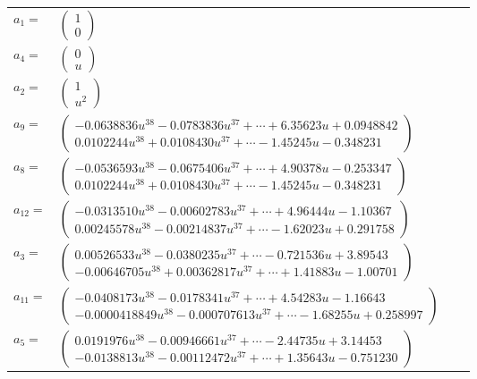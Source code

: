 \documentclass[1p]{elsarticle_modified}
\theoremstyle{definition}
\begin{document}
\begin{tabular}{m{7pt} m{180pt} m{7pt} m{180pt} }
\flushright $a_{1}=$&$\begin{pmatrix}1\\0\end{pmatrix}$ \\
\flushright $a_{4}=$&$\begin{pmatrix}0\\u\end{pmatrix}$ \\
\flushright $a_{2}=$&$\begin{pmatrix}1\\u^2\end{pmatrix}$ \\
\flushright $a_{9}=$&$\begin{pmatrix}-0.0638836 u^{38}-0.0783836 u^{37}+\cdots+6.35623 u+0.0948842\\0.0102244 u^{38}+0.0108430 u^{37}+\cdots-1.45245 u-0.348231\end{pmatrix}$ \\
\flushright $a_{8}=$&$\begin{pmatrix}-0.0536593 u^{38}-0.0675406 u^{37}+\cdots+4.90378 u-0.253347\\0.0102244 u^{38}+0.0108430 u^{37}+\cdots-1.45245 u-0.348231\end{pmatrix}$ \\
\flushright $a_{12}=$&$\begin{pmatrix}-0.0313510 u^{38}-0.00602783 u^{37}+\cdots+4.96444 u-1.10367\\0.00245578 u^{38}-0.00214837 u^{37}+\cdots-1.62023 u+0.291758\end{pmatrix}$ \\
\flushright $a_{3}=$&$\begin{pmatrix}0.00526533 u^{38}-0.0380235 u^{37}+\cdots-0.721536 u+3.89543\\-0.00646705 u^{38}+0.00362817 u^{37}+\cdots+1.41883 u-1.00701\end{pmatrix}$ \\
\flushright $a_{11}=$&$\begin{pmatrix}-0.0408173 u^{38}-0.0178341 u^{37}+\cdots+4.54283 u-1.16643\\-0.0000418849 u^{38}-0.000707613 u^{37}+\cdots-1.68255 u+0.258997\end{pmatrix}$ \\
\flushright $a_{5}=$&$\begin{pmatrix}0.0191976 u^{38}-0.00946661 u^{37}+\cdots-2.44735 u+3.14453\\-0.0138813 u^{38}-0.00112472 u^{37}+\cdots+1.35643 u-0.751230\end{pmatrix}$ \\

\end{tabular}
\end{document}
